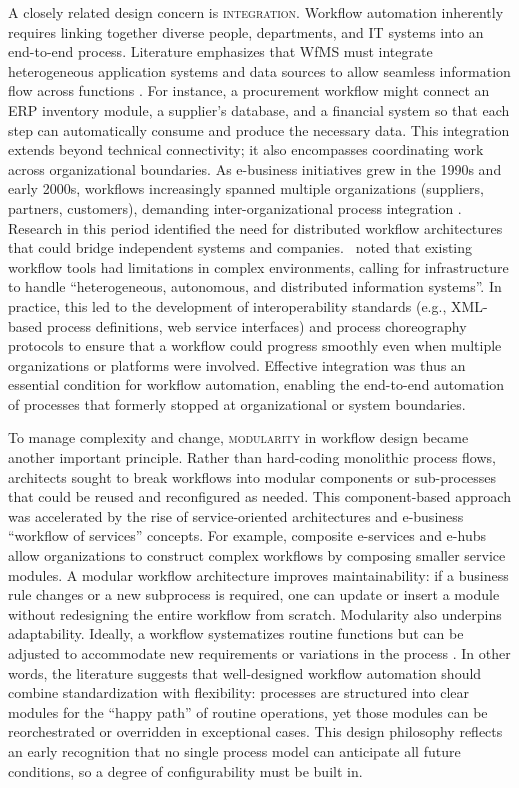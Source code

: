 A closely related design concern is \textsc{integration}. Workflow automation inherently requires linking together diverse people, departments, and IT systems into an end-to-end process. Literature emphasizes that WfMS must integrate heterogeneous application systems and data sources to allow seamless information flow across functions \parencite{stohrWorkflow2001}. For instance, a procurement workflow might connect an ERP inventory module, a supplier's database, and a financial system so that each step can automatically consume and produce the necessary data. This integration extends beyond technical connectivity; it also encompasses coordinating work across organizational boundaries. As e-business initiatives grew in the 1990s and early 2000s, workflows increasingly spanned multiple organizations (suppliers, partners, customers), demanding inter-organizational process integration \parencite{basuResearch2002}. Research in this period identified the need for distributed workflow architectures that could bridge independent systems and companies.~\textcite{georgakopoulosOverview1995} noted that existing workflow tools had limitations in complex environments, calling for infrastructure to handle “heterogeneous, autonomous, and distributed information systems”. In practice, this led to the development of interoperability standards (e.g., XML-based process definitions, web service interfaces) and process choreography protocols to ensure that a workflow could progress smoothly even when multiple organizations or platforms were involved. Effective integration was thus an essential condition for workflow automation, enabling the end-to-end automation of processes that formerly stopped at organizational or system boundaries.

To manage complexity and change, \textsc{modularity} in workflow design became another important principle. Rather than hard-coding monolithic process flows, architects sought to break workflows into modular components or sub-processes that could be reused and reconfigured as needed. This component-based approach was accelerated by the rise of service-oriented architectures and e-business “workflow of services” concepts. For example, composite e-services and e-hubs allow organizations to construct complex workflows by composing smaller service modules. A modular workflow architecture improves maintainability: if a business rule changes or a new subprocess is required, one can update or insert a module without redesigning the entire workflow from scratch. Modularity also underpins adaptability. Ideally, a workflow systematizes routine functions but can be adjusted to accommodate new requirements or variations in the process \parencite{basuResearch2002}. In other words, the literature suggests that well-designed workflow automation should combine standardization with flexibility: processes are structured into clear modules for the “happy path” of routine operations, yet those modules can be reorchestrated or overridden in exceptional cases. This design philosophy reflects an early recognition that no single process model can anticipate all future conditions, so a degree of configurability must be built in.

